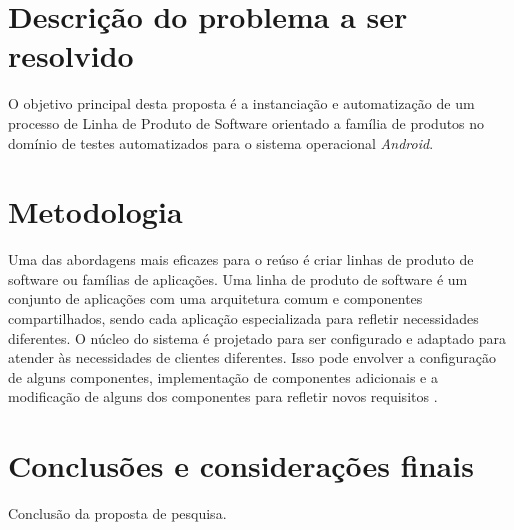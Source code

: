\documentclass[10pt,a4paper]{article}
\begin{document}
\section{Descrição do problema a ser resolvido}
O objetivo principal desta proposta é a instanciação e automatização de um processo de Linha de Produto de Software orientado a família de produtos no domínio de testes automatizados para o sistema operacional \textit{Android}.
\section{Metodologia}
Uma das abordagens mais eficazes para o reúso é criar linhas de produto de software ou famílias de aplicações. Uma linha de produto de software é um conjunto de aplicações com uma arquitetura comum e componentes compartilhados, sendo cada aplicação especializada para refletir necessidades diferentes. O núcleo do sistema é projetado para ser configurado e adaptado para atender às necessidades de clientes diferentes. Isso pode envolver a configuração de alguns componentes, implementação de componentes adicionais e a modificação de alguns dos componentes para refletir novos requisitos \cite{Sommerville2011}.

\section{Conclusões e considerações finais}
Conclusão da proposta de pesquisa.




\end{document}
